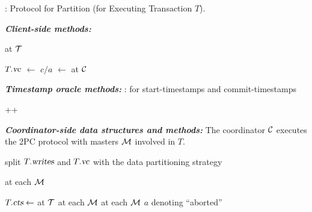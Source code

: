 
\begin{algorithm}[H]
  \caption{\rvsimp{}: \rvsi{} Protocol for Partition (for Executing Transaction $T$).} %
  \label{alg:alg-rvsi-partition}
  \begin{algorithmic}[1]
    \Statex \textbf{\textit{Client-side methods:}}
    \hStatex

	\State \Return {}  at $\mathcal{T}{}$
		\label{line:rvsimp-client-call-getts}
    \EndProcedure

		\label{line:rvsimp-call-end}
      \State $T.\textsl{vc}$ $\gets$  \label{line:rvsimp-call-add-vc}
      \State $c/a$ $\gets$   
      at $\mathcal{C}$ \label{line:rvsimp-call-commit}
    \EndProcedure

    \Statex \hrulefill
    \Statex \textbf{\textit{Timestamp oracle methods:}}
    \hStatex
	\Statex \tots{}: for start-timestamps and commit-timestamps

		\label{line:rvsimp-getts}
	  \State \Return ++\tots{}
	\EndProcedure

    \Statex \hrulefill
    \Statex \textbf{\textit{Coordinator-side data structures and methods:}}
    \Statex The coordinator $\mathcal{C}$ executes the 2PC protocol with masters $\mathcal{M}$ involved in $T$.
    \hStatex

		\label{line:rvsimp-ccommit}
	\State split $T.\textsl{writes}$ and $T.\textsl{vc}$ with the data partitioning strategy	
	  \label{line:rvsimp-partition}
	  \hStatex

	  \State {}  at each $\mathcal{M}$
		\label{line:rvsimp-call-prepare}

		\label{line:rvsimp-prepare-all-true}
	  \State $T.\textsl{cts} \gets$  
		 at $\mathcal{T}$
		  \label{line:rvsimp-coord-call-getts}
		\State {}  at each $\mathcal{M}$
		  \label{line:rvsimp-coord-call-commit}
      \Else
        \State {}  at each $\mathcal{M}$
		  \label{line:rvsimp-coord-call-abort}
        \State \Return $a$ denoting ``aborted''
      \EndIf


\end{algorithmic}
\end{algorithm}
